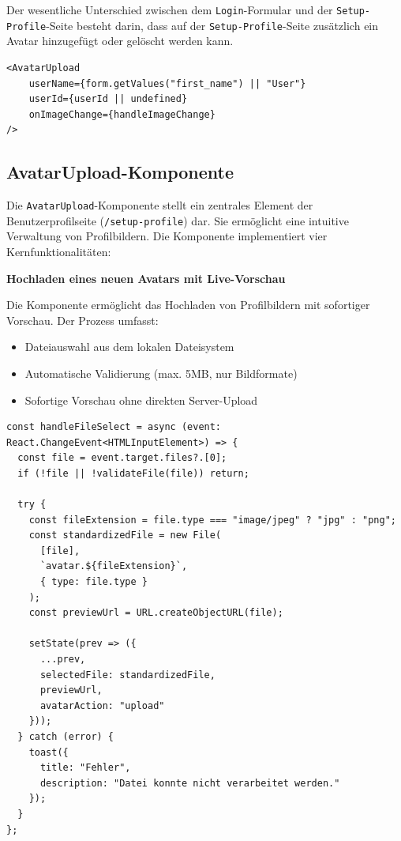 \begin{inhalt}
Der wesentliche Unterschied zwischen dem \texttt{Login}-Formular und der \texttt{Setup-Profile}-Seite besteht darin, dass auf der \texttt{Setup-Profile}-Seite zusätzlich ein Avatar hinzugefügt oder gelöscht werden kann.

\begin{lstlisting}[style=mytsx]
<AvatarUpload
    userName={form.getValues("first_name") || "User"}
    userId={userId || undefined}
    onImageChange={handleImageChange}
/>
\end{lstlisting}

\newpage

\subsection{AvatarUpload-Komponente}

Die \texttt{AvatarUpload}-Komponente stellt ein zentrales Element der Benutzerprofilseite (\texttt{/setup-profile}) dar. Sie ermöglicht eine intuitive Verwaltung von Profilbildern. Die Komponente implementiert vier Kernfunktionalitäten:

\vspace{0.75cm}

\textbf{Hochladen eines neuen Avatars mit Live-Vorschau}

\vspace{0.15cm}

Die Komponente ermöglicht das Hochladen von Profilbildern mit sofortiger Vorschau. Der Prozess umfasst:
\begin{itemize}
    \item Dateiauswahl aus dem lokalen Dateisystem
    \item Automatische Validierung (max. 5MB, nur Bildformate)
    \item Sofortige Vorschau ohne direkten Server-Upload
\end{itemize}


\begin{lstlisting}[style=mytsx, label={lst:avatar_upload}]
const handleFileSelect = async (event: React.ChangeEvent<HTMLInputElement>) => {
  const file = event.target.files?.[0];
  if (!file || !validateFile(file)) return;

  try {
    const fileExtension = file.type === "image/jpeg" ? "jpg" : "png";
    const standardizedFile = new File(
      [file], 
      `avatar.${fileExtension}`, 
      { type: file.type }
    );
    const previewUrl = URL.createObjectURL(file);

    setState(prev => ({
      ...prev,
      selectedFile: standardizedFile,
      previewUrl,
      avatarAction: "upload"
    }));
  } catch (error) {
    toast({
      title: "Fehler",
      description: "Datei konnte nicht verarbeitet werden."
    });
  }
};
\end{lstlisting}


\end{inhalt}
